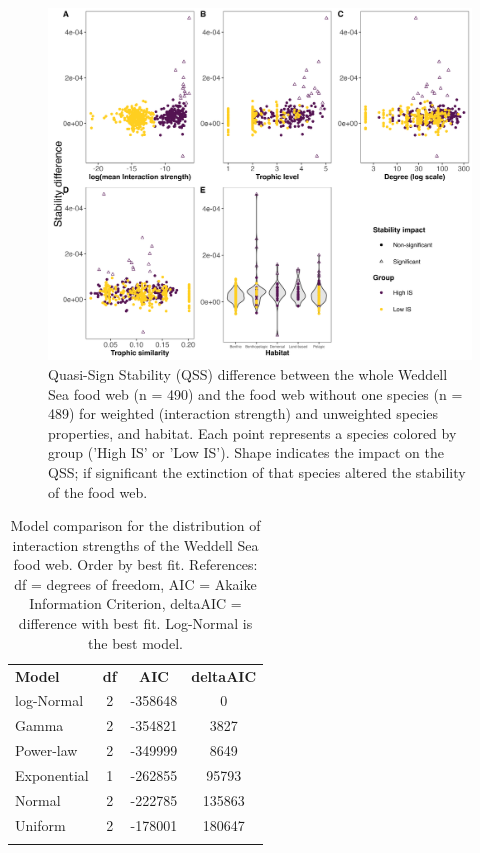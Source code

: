 \documentclass[gc, manuscript]{copernicus}
\begin{document}
\clearpage

\begin{figure}
\includegraphics[width=12cm]{Fig.6_QSSDif} \caption{Quasi-Sign Stability (QSS) difference between the whole Weddell Sea food web (n = 490) and the food web without one species (n = 489) for weighted (interaction strength) and unweighted species properties, and habitat. Each point represents a species colored by group ('High IS' or 'Low IS'). Shape indicates the impact on the QSS; if significant the extinction of that species altered the stability of the food web.}\label{fig:unnamed-chunk-6}
\end{figure}

\clearpage

\begin{table}[t]
\caption{Model comparison for the distribution of interaction strengths of the Weddell Sea food web. Order by best fit. References: df = degrees of freedom, AIC = Akaike Information Criterion, deltaAIC = difference with best fit. Log-Normal is the best model.}
\begin{tabular}{l c c c}
\tophline

\textbf{Model} & \textbf{df} & \textbf{AIC} & \textbf{deltaAIC} \\
\middlehline
log-Normal & 2 & -358648 & 0 \\
\middlehline
Gamma & 2 & -354821 & 3827 \\
\middlehline
Power-law & 2 & -349999 & 8649 \\
\middlehline
Exponential & 1 & -262855 & 95793 \\
\middlehline
Normal & 2 & -222785 & 135863 \\
\middlehline
Uniform & 2 & -178001 & 180647 \\

\bottomhline
\end{tabular}
\end{table}
\end{document}
